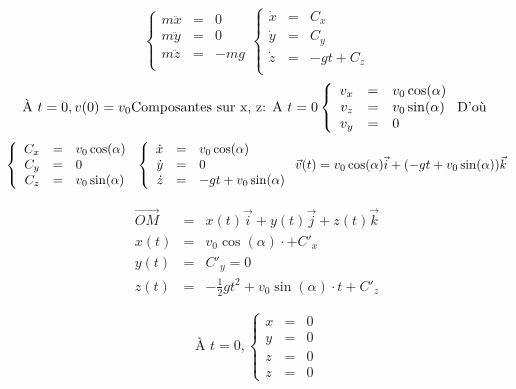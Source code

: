 \[\left\{
		\begin{array}{rcl}
			m\ddot{x} &=& 0 \\
			m\ddot{y} &=& 0 \\
			m\ddot{z} &=& -mg \\
		\end{array}\right.
		\left\{
		\begin{array}{rcl}
			\dot{x} &=& C_x \\
			\dot{y} &=& C_y \\
			\dot{z} &=& -gt + C_z \\
		\end{array}\right.
	\]
	\[\text{À } t=0 , v(0) = v_0 ~\\
	\text{Composantes sur x, z: } ~\\
	\text{A } t = 0 \left\{
		\begin{array}{rcl}
			v_x &=& v_0 \cos(\alpha) \\
			v_z &=& v_0 \sin(\alpha) \\
			v_y &=& 0 \end{array} \right.
			\text{D'où } 
		\]
		\[
		\left\{
		\begin{array}{rcl}
				C_x &=& v_0 \cos(\alpha) \\
				C_y &=& 0 \\
				C_z &=& v_0 \sin(\alpha) \end{array}\right. ~\\
		\left\{ \begin{array}{rcl}
				\dot{x} &=& v_0 \cos (\alpha) \\
				\dot{y} &=& 0 \\
				\dot{z} &=& -gt + v_0 \sin(\alpha) \end{array}\right. ~\\
		\vec{v}(t) = v_0\cos(\alpha)\vec{i} + (-gt+v_0\sin(\alpha))\vec{k}\] 

\[\begin{array}{rcl}
		\overrightarrow{OM} &=& x(t)\vec{i} + y(t) \vec{j} + z(t) \vec{k} \\
		x(t) &=& v_0\cos(\alpha) \cdot + C'_x \\
		y(t) &=& C'_y = 0 \\
z(t) &=& -\frac{1}{2}gt^2 + v_0 \sin(\alpha)\cdot t + C'_z \end{array}\]

		\[\text{À } t=0,
			\left\{ \begin{array}{rcl}
			x &=& 0 \\
			y &=& 0 \\
			z &=& 0 \\
			z &=& 0\end{array}\right.\]

